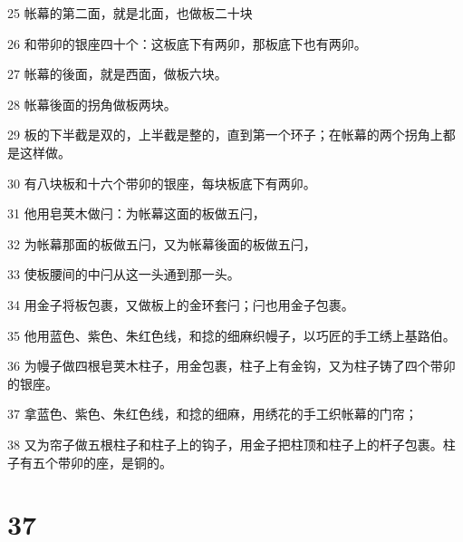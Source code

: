 \par 25 帐幕的第二面，就是北面，也做板二十块
\par 26 和带卯的银座四十个：这板底下有两卯，那板底下也有两卯。
\par 27 帐幕的後面，就是西面，做板六块。
\par 28 帐幕後面的拐角做板两块。
\par 29 板的下半截是双的，上半截是整的，直到第一个环子；在帐幕的两个拐角上都是这样做。
\par 30 有八块板和十六个带卯的银座，每块板底下有两卯。
\par 31 他用皂荚木做闩：为帐幕这面的板做五闩，
\par 32 为帐幕那面的板做五闩，又为帐幕後面的板做五闩，
\par 33 使板腰间的中闩从这一头通到那一头。
\par 34 用金子将板包裹，又做板上的金环套闩；闩也用金子包裹。
\par 35 他用蓝色、紫色、朱红色线，和捻的细麻织幔子，以巧匠的手工绣上基路伯。
\par 36 为幔子做四根皂荚木柱子，用金包裹，柱子上有金钩，又为柱子铸了四个带卯的银座。
\par 37 拿蓝色、紫色、朱红色线，和捻的细麻，用绣花的手工织帐幕的门帘；
\par 38 又为帘子做五根柱子和柱子上的钩子，用金子把柱顶和柱子上的杆子包裹。柱子有五个带卯的座，是铜的。

\chapter{37}

